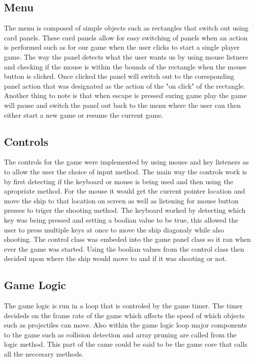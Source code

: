 \subsection{Menu}
The menu is composed of simple objects such as rectangles that switch out using card panels. These card panels allow for easy switching of panels when an action is performed such as for our game when the user clicks to start a single player game. The way the panel detects what the user wants us by using mouse listners and checking if the mouse is within the bounds of the rectangle when the mouse button is clicked. Once clicked the panel will switch out to the coresponding panel action that was designated as the action of the "on click" of the rectangle. Another thing to note is that when escape is pressed suring game play the game will pause and switch the panel out back to the menu where the user can then either start a new game or resume the current game.
\subsection{Controls}
The controls for the game were implemented by using mouse and key listeners as to allow the user the choice of input method. The main way the controls work is by first detecting if the keyboard or mouse is being used and then using the apropriate method. For the mouse it would get the current pointer location and move the ship to that location on screen as well as listening for mouse button presses to triger the shooting method. The keyboard worked by detecting which key was being pressed and setting a boolian value to be true, this allowed the user to press multiple keys at once to move the ship diagonaly while also shooting. The control class was embeded into the game panel class so it ran when ever the game was started. Using the boolian values from the control class then decided upon where the ship would move to and if it was shooting or not.
\subsection{Game Logic}
The game logic is run in a loop that is controled by the game timer. The timer decideds on the frame rate of the game which affects the speed of which objects such as projectiles can move. Also within the game logic loop major components to the game such as collision detection and array pruning are called from the logic method. This part of the came could be said to be the game core that calls all the neccesary methods.
